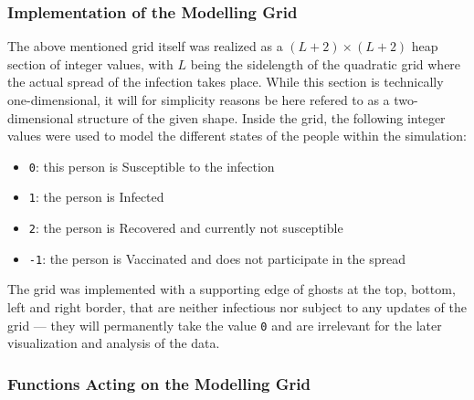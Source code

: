 \subsubsection{Implementation of the Modelling Grid}\label{ssec:impl_modelling_grid}

The above mentioned grid itself was realized as a $\left(L+2\right)\times \left(L+2\right)$ heap section of integer values, with $L$ being the sidelength of the quadratic grid where the actual spread of the
infection takes place. While this section is technically one-dimensional, it will for simplicity reasons be here refered to as a two-dimensional structure of the given shape. 
Inside the grid, the following integer values were used to model the different states of the people within the simulation:
\begin{itemize}
    \item \texttt{0}: this person is Susceptible \susceptible{} to the infection
    \item \texttt{1}: the person is Infected \infected{}
    \item \texttt{2}: the person is Recovered \recovered{} and currently not susceptible
    \item \texttt{-1}: the person is Vaccinated \vaccinated{} and does not participate in the spread
\end{itemize}
The grid was implemented with a supporting edge of ghosts at the top, bottom, left and right border, that are neither infectious nor subject to any updates of the grid --- they will permanently take the value
\texttt{0} and are irrelevant for the later visualization and analysis of the data.


\subsubsection{Functions Acting on the Modelling Grid}\label{ssec:impl_functions_on_grid}

